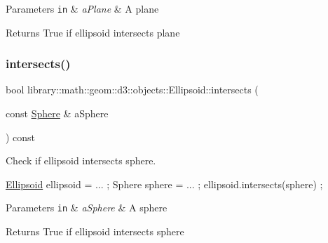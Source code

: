 \begin{DoxyParams}[1]{Parameters}
\mbox{\tt in}  & {\em a\+Plane} & A plane \\
\hline
\end{DoxyParams}
\begin{DoxyReturn}{Returns}
True if ellipsoid intersects plane 
\end{DoxyReturn}
\mbox{\label{classlibrary_1_1math_1_1geom_1_1d3_1_1objects_1_1_ellipsoid_aa9d3833e3d2be95ff00d7af32fe9b15e}} 
\subsubsection{\texorpdfstring{intersects()}{intersects()}\hspace{0.1cm}{\footnotesize\ttfamily [7/10]}}
{\footnotesize\ttfamily bool library\+::math\+::geom\+::d3\+::objects\+::\+Ellipsoid\+::intersects (\begin{DoxyParamCaption}\item[{const \hyperlink{classlibrary_1_1math_1_1geom_1_1d3_1_1objects_1_1_sphere}{Sphere} \&}]{a\+Sphere }\end{DoxyParamCaption}) const}



Check if ellipsoid intersects sphere. 


\begin{DoxyCode}
\hyperlink{classlibrary_1_1math_1_1geom_1_1d3_1_1objects_1_1_ellipsoid_aae81fe0edc7f0e8d4590ea89ae73cb14}{Ellipsoid} ellipsoid = ... ;
Sphere sphere = ... ;
ellipsoid.intersects(sphere) ;
\end{DoxyCode}



\begin{DoxyParams}[1]{Parameters}
\mbox{\tt in}  & {\em a\+Sphere} & A sphere \\
\hline
\end{DoxyParams}
\begin{DoxyReturn}{Returns}
True if ellipsoid intersects sphere 
\end{DoxyReturn}
\mbox{\label{classlibrary_1_1math_1_1geom_1_1d3_1_1objects_1_1_ellipsoid_a4dfd1a3feba0ebed8a5adf89120ce53c}} 
